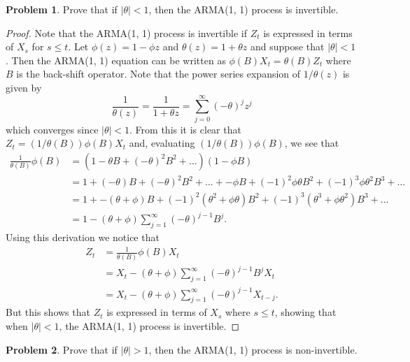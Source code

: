 \documentclass[12pt]{article}
\theoremstyle{definition}
\newtheorem{problem}{Problem}
\begin{document}
\begin{problem}
  Prove that if $|\theta| < 1$, then the ARMA(1, 1) process is invertible.
\end{problem}

\begin{proof}
  Note that the ARMA(1, 1) process is invertible if $Z_t$ is expressed in
  terms of $X_s$ for $s\leq t$. Let $\phi(z) = 1 - \phi z$ and $\theta(z) = 1 + \theta z$
  and suppose that $|\theta| < 1$.
  Then the ARMA(1, 1) equation can be written as $\phi(B)X_t = \theta(B)Z_t$ where
  $B$ is the back-shift operator. Note that the power series expansion of $1/\theta(z)$
  is given by
  \[
    \frac{1}{\theta(z)} = \frac{1}{1+\theta z} = \sum_{j=0}^{\infty} (-\theta)^j z^j
  \]
  which converges since $|\theta| < 1$. From this it is clear that
  $Z_t = (1/\theta(B))\phi(B)X_t$ and, evaluating $(1/\theta(B))\phi(B)$, we see that
  \begin{align*}
    \frac{1}{\theta(B)}\phi(B)
    &= (1 -\theta B + (-\theta)^2 B^2 + \dots )(1 - \phi B)\\
    &= 1 + (-\theta) B + (-\theta)^2 B^2 + \dots + -\phi B + (-1)^2 \phi \theta B^2 + (-1)^3 \phi \theta^2 B^3 + \dots \\
    &= 1 + -(\theta + \phi)B + (-1)^2(\theta^2 + \phi\theta)B^2 + (-1)^3(\theta^3 + \phi\theta^2)B^3 + \dots \\
    &= 1 -(\theta + \phi)\sum_{j=1}^\infty (-\theta)^{j-1}B^{j}.
  \end{align*}
  Using this derivation we notice that
  \begin{align*}
    Z_t
    &= \frac{1}{\theta(B)}\phi(B) X_t \\
    &= X_t -(\theta + \phi)\sum_{j=1}^\infty (-\theta)^{j-1}B^{j}X_t \\
    &= X_t -(\theta + \phi)\sum_{j=1}^\infty (-\theta)^{j-1}X_{t-j}.
  \end{align*}
  But this shows that $Z_t$ is expressed in terms of $X_s$ where $s\leq t$,
  showing that when $|\theta| < 1$, the ARMA(1, 1) process is invertible.
\end{proof}


\begin{problem}
  Prove that if $|\theta| > 1$, then the ARMA(1, 1) process is non-invertible.
\end{problem}
\end{document}
